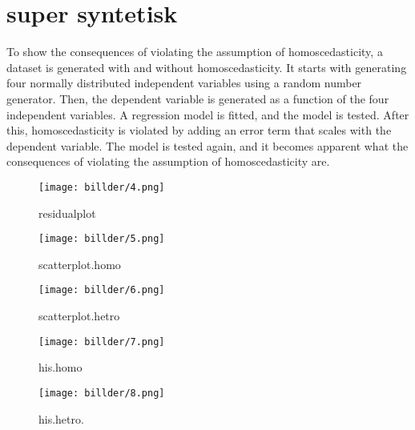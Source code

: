 \section{super syntetisk }

To show the consequences of violating the assumption of homoscedasticity, a dataset is generated with and without homoscedasticity. It starts with generating four normally distributed independent variables using a random number generator. Then, the dependent variable is generated as a function of the four independent variables. A regression model is fitted, and the model is tested. After this, homoscedasticity is violated by adding an error term that scales with the dependent variable. The model is tested again, and it becomes apparent what the consequences of violating the assumption of homoscedasticity are.





\begin{figure}[h] 
	\centering\texttt{[image: billder/4.png]}
	\caption{residualplot}
	\label{fig:j06}
\end{figure}

\begin{figure}[h] 
	\centering\texttt{[image: billder/5.png]}
	\caption{scatterplot.homo}
	\label{fig:j06}
\end{figure}

\begin{figure}[h] 
	\centering\texttt{[image: billder/6.png]}
	\caption{scatterplot.hetro}
	\label{fig:j06}
\end{figure}

\begin{figure}[h] 
	\centering\texttt{[image: billder/7.png]}
	\caption{his.homo}
	\label{fig:j06}
\end{figure}

\begin{figure}[h] 
	\centering
	\texttt{[image: billder/8.png]}
	\caption{his.hetro.}
	\label{fig:j06}
\end{figure}



%



